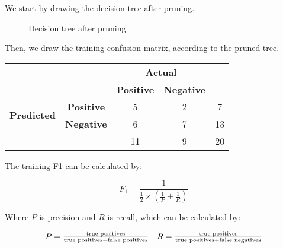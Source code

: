 \documentclass[12pt]{article}
\begin{document}
\begin{enumerate}[leftmargin=\labelsep]
          We start by drawing the decision tree after pruning.

          \begin{figure}[H]
              \centering
              
              \caption{Decision tree after pruning}
              \label{fig:ex2-tree-pruned}
          \end{figure}

          Then, we draw the training confusion matrix, according to the pruned tree.

          \begin{center}
              \begin{tabular}{|c|c|c|c|c|}
                  \cline{3-4}
                  \multicolumn{2}{c}{}                & \multicolumn{2}{|c|}{\textbf{Actual}} & \multicolumn{1}{c}{}                             \\
                  \cline{3-4}
                  \multicolumn{2}{c|}{}               & \textbf{Positive}                     & \textbf{Negative}    & \multicolumn{1}{c}{}      \\
                  \hline
                  \multirow{2}{*}{\textbf{Predicted}} & \textbf{Positive}                     & 5                    & 2                    & 7  \\
                  \cline{2-5}
                                                      & \textbf{Negative}                     & 6                    & 7                    & 13 \\
                  \hline
                  \multicolumn{2}{c|}{}               & 11                                    & 9                    & 20                        \\
                  \cline{3-5}
              \end{tabular}
          \end{center}

          The training F1 can be calculated by:

          \begin{equation}\label{ex2-f1}
              F_1 = \frac{1}{\frac{1}{2} \times \left(\frac{1}{P} + \frac{1}{R}\right)}
          \end{equation}

          Where \(P\) is precision and \(R\) is recall, which can be calculated by:

          \begin{equation}\label{ex2-precision-recall}
              \begin{array}{l r}
                  P = \frac{\text{true positives}}{\text{true positives} + \text{false positives}}
                   & R = \frac{\text{true positives}}{\text{true positives} + \text{false negatives}}
              \end{array}
          \end{equation}


\end{enumerate}
\end{document}
